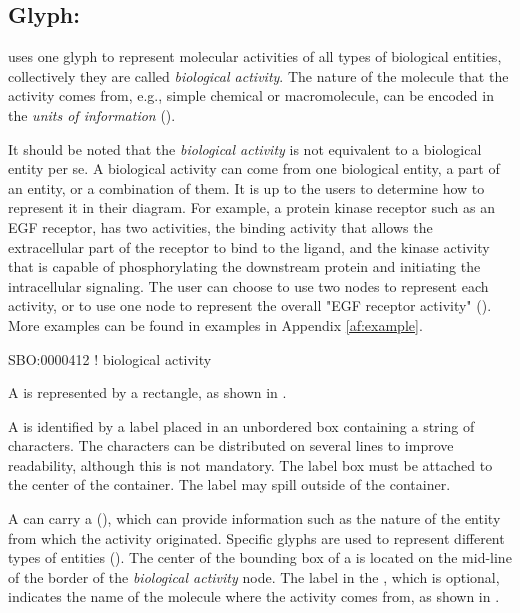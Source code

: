\subsection{Glyph: }
\label{sec:af:biologicalActivity}

\SBGNAFLone uses one glyph to represent molecular activities of all types of biological entities, collectively they are called \emph{biological activity}. The nature of the molecule that the activity comes from, e.g., simple chemical or macromolecule, can be encoded in the \emph{units of information} ().

It should be noted that the \emph{biological activity} is not equivalent to a biological entity per se.  A biological activity can come from one biological entity, a part of an entity, or a combination of  them.  It is up to the users to determine how to represent it in their diagram.  For example, a protein kinase receptor such as an EGF receptor, has two activities, the binding activity that allows the extracellular part of the receptor to bind to the ligand, and the kinase activity that is capable of phosphorylating the downstream protein and initiating the intracellular signaling.  The user can choose to use two nodes to represent each activity, or to use one node to represent the overall "EGF receptor activity" ().  More examples can be found in examples in Appendix \ref{af:example}.

\begin{glyphDescription}

\glyphSboTerm SBO:0000412 ! biological activity

\glyphContainer A  is represented by a rectangle, as shown in .

\glyphLabel A  is identified by a label placed in an unbordered box containing a string of characters.  The characters can be distributed on several lines to improve readability, although this is not mandatory.  The label box must be attached to the center of the container.  The label may spill outside of the container.

\glyphAux A  can carry a  (), which can provide information such as the nature of the entity from which the activity originated.  Specific glyphs are used to represent different types of entities ().  The center of the bounding box of a  is located on the mid-line of the border of the \emph{biological activity} node.  The label in the , which is optional, indicates the name of the molecule where the activity comes from, as shown in .

\end{glyphDescription}

